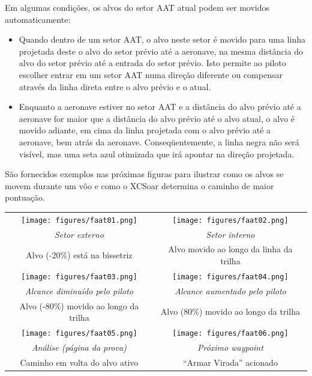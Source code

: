 Em algumas condições, os alvos do setor AAT atual podem ser movidos automaticamente:

\begin{itemize}
\item Quando dentro de um setor AAT, o alvo neste setor é movido para uma linha projetada deste o alvo do setor prévio até a aeronave, na mesma distância do alvo do setor prévio até a entrada do setor prévio.  Isto permite ao piloto escolher entrar em um setor AAT numa direção diferente ou compensar através da linha direta entre o alvo prévio e o atual.

\item Enquanto a aeronave estiver no setor AAT e a distância do alvo prévio até a aeronave for maior que a distância do alvo prévio até o alvo atual, o alvo é movido adiante, em cima da linha projetada com o alvo prévio até a aeronave, bem atrás da aeronave.  Conseqüentemente, a linha negra não será visível, mas uma seta azul otimizada que irá apontar na direção projetada.
\end{itemize}

São fornecidos exemplos nas próximas figuras para ilustrar como os alvos se movem durante um vôo e como o XCSoar determina o caminho de maior pontuação. 

\begin{maxipage}
\begin{center}
\begin{longtable}{|c|c|}
\toprule
\texttt{[image: figures/faat01.png]} & 
\texttt{[image: figures/faat02.png]} \\
{\em Setor externo} & {\em Setor interno} \\
Alvo  (-20\%) está na bissetriz & Alvo  movido  ao longo da linha da trilha \\

\midrule
\texttt{[image: figures/faat03.png]} & 
\texttt{[image: figures/faat04.png]} \\
{\em Alcance diminuído pelo piloto} & {\em Alcance aumentado pelo piloto} \\
Alvo  (-80\%) movido ao longo da trilha & Alvo  (80\%) movido ao longo da trilha \\

\midrule
\texttt{[image: figures/faat05.png]} & 
\texttt{[image: figures/faat06.png]} \\
{\em Análise (página da prova)} & {\em Próximo waypoint} \\
Caminho em volta do alvo ativo  & “Armar Virada” acionado \\
\bottomrule
\end{longtable}
\end{center}
\end{maxipage}

